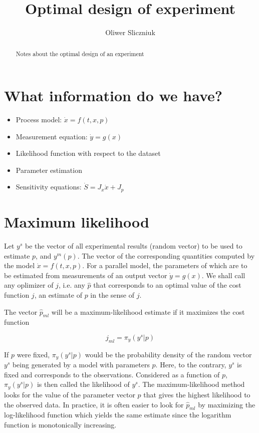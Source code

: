 \documentclass[]{scrartcl}
\title{Optimal design of experiment}
\author{Oliwer Sliczniuk}
\begin{document}
\maketitle

\begin{abstract}
Notes about the optimal design of an experiment
\end{abstract}

\section{What information do we have?}

\begin{itemize}
	\item Process model: $\dot{x}=f(t,x,p)$
	\item Measurement equation: $\dot{y}=g(x)$
	\item Likelihood function with respect to the dataset
	\item Parameter estimation
	\item Sensitivity equations: $\dot{S} = J_x \dot{x} + J_p$
\end{itemize}

\section{Maximum likelihood}
Let $y^s$ be the vector of all experimental results (random vector) to be used to estimate $p$, and $y^m(p)$. The vector of the corresponding quantities computed by the model $\dot{x}=f(t,x,p)$. For a parallel model, the parameters of which are to be estimated from measurements of an output vector $\dot{y}=g(x)$. We shall call any
oplimizer of $j$, i.e. any $\hat{p}$ that corresponds to an optimal value of the cost function $j$, an estimate of $p$ in the sense of $j$.

The vector $\hat{p}_{ml}$ will be a maximum-likelihood estimate if it maximizes the cost function

\begin{equation}
	j_{ml} = \pi_y (y^s|p) 
\end{equation}

If $p$ were fixed, $\pi_y(y^s|p)$ would be the probability density of the random vector $y^s$ being generated by a model with parameters $p$. Here, to the contrary, $y^s$ is fixed and corresponds to the observations. Considered as a function of $p$, $\pi_y(y^s|p)$ is then called the likelihood of $y^s$. The maximum-likelihood method looks for the value of the parameter vector $p$ that gives the highest likelihood to the observed data. In practice, it is often easier to look for $\hat{p}_{ml}$ by maximizing the log-likelihood function which yields the same estimate since the logarithm function is monotonically increasing.
\end{document}
